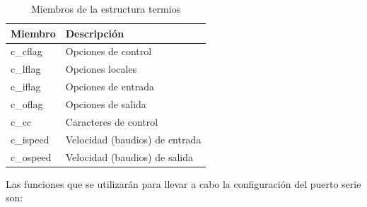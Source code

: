 \documentclass[12pt,twoside]{book}
\begin{document}
\begin{table}[htbp]
\begin{center}
\begin{tabular}{|l|l|}
\hline
Miembro & Descripción \\
\hline \hline
c\_cflag & Opciones de control \\ \hline
c\_lflag & Opciones locales \\ \hline
c\_iflag & Opciones de entrada \\ \hline
c\_oflag & Opciones de salida \\ \hline
c\_cc & Caracteres de control \\ \hline
c\_ispeed & Velocidad (baudios) de entrada\\ \hline
c\_ospeed & Velocidad (baudios) de salida \\ \hline
\end{tabular}
\caption{Miembros de la estructura termios}
\label{T002}
\end{center}
\end{table}

Las funciones que se utilizarán para llevar a cabo la configuración del puerto
serie son:
\end{document}
